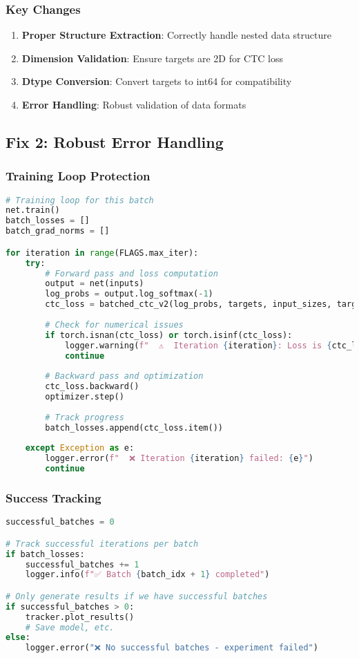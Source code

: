 \documentclass[11pt,a4paper]{article}
\begin{document}
\subsubsection{Key Changes}
\begin{enumerate}
    \item \textbf{Proper Structure Extraction}: Correctly handle nested data structure
    \item \textbf{Dimension Validation}: Ensure targets are 2D for CTC loss
    \item \textbf{Dtype Conversion}: Convert targets to int64 for compatibility
    \item \textbf{Error Handling}: Robust validation of data formats
\end{enumerate}

\subsection{Fix 2: Robust Error Handling}

\subsubsection{Training Loop Protection}
\begin{lstlisting}[language=Python, caption=Protected Training Loop]
# Training loop for this batch
net.train()
batch_losses = []
batch_grad_norms = []

for iteration in range(FLAGS.max_iter):
    try:
        # Forward pass and loss computation
        output = net(inputs)
        log_probs = output.log_softmax(-1)
        ctc_loss = batched_ctc_v2(log_probs, targets, input_sizes, target_sizes)
        
        # Check for numerical issues
        if torch.isnan(ctc_loss) or torch.isinf(ctc_loss):
            logger.warning(f"  ⚠️  Iteration {iteration}: Loss is {ctc_loss.item()}")
            continue
        
        # Backward pass and optimization
        ctc_loss.backward()
        optimizer.step()
        
        # Track progress
        batch_losses.append(ctc_loss.item())
        
    except Exception as e:
        logger.error(f"  ❌ Iteration {iteration} failed: {e}")
        continue
\end{lstlisting}

\subsubsection{Success Tracking}
\begin{lstlisting}[language=Python, caption=Success Tracking Implementation]
successful_batches = 0

# Track successful iterations per batch
if batch_losses:
    successful_batches += 1
    logger.info(f"✅ Batch {batch_idx + 1} completed")

# Only generate results if we have successful batches
if successful_batches > 0:
    tracker.plot_results()
    # Save model, etc.
else:
    logger.error("❌ No successful batches - experiment failed")
\end{lstlisting}
\end{document}
